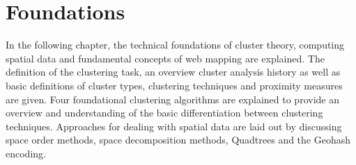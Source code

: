 
%
%

\chapter{Foundations}
\label{chapter:foundations}

In the following chapter, the technical foundations of cluster theory, computing spatial data and fundamental concepts of web mapping are explained. The definition of the clustering task, an overview cluster analysis history as well as basic definitions of cluster types, clustering techniques and proximity measures are given. Four foundational clustering algorithms are explained to provide an overview and understanding of the basic differentiation between clustering techniques. Approaches for dealing with spatial data are laid out by discussing space order methods, space decomposition methods, Quadtrees and the Geohash encoding.












